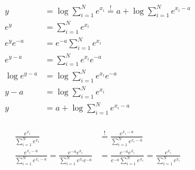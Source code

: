 

\newcommand{\ExerciseNumber}{09}

\newcommand{\PersonOne}{Marcel Bruckner (03674122)}
\newcommand{\PersonTwo}{Julian Hohenadel (03673879)}
\newcommand{\PersonThree}{Kevin Bein (03707775)}






%
%
%
\begin{flushleft}
\begin{align*}
y &= \log \sum_{i=1}^{N}e^{x_i} \stackrel{!}{=} a + \log \sum_{i=1}^{N}e^{x_i-a}\\
e^y &= \sum_{i=1}^{N}e^{x_i}\\
e^y e^{-a} &= e^{-a} \sum_{i=1}^{N}e^{x_i}\\
e^{y-a} &= \sum_{i=1}^{N}e^{x_i} e^{-a} \\
\log e^{y-a} &= \log \sum_{i=1}^{N}e^{x_i} e^{-a}\\
y-a &= \log \sum_{i=1}^{N}e^{x_i}\\
y &= a + \log \sum_{i=1}^{N}e^{x_i - a}\\
\end{align*}
\end{flushleft}
%
%
%
\begin{flushleft}
\begin{align*}
\frac{e^{x_i}}{\sum^{N}_{i=1} e^{x_i}} &\stackrel{!}{=} 
\frac{e^{x_{i}-a}}{\sum^{N}_{i=1} e^{x_i - a}}\\
\frac{e^{x_{i}-a}}{\sum^{N}_{i=1} e^{x_i - a}} = 
\frac{e^{-a}e^{x_{i}}}{\sum^{N}_{i=1} e^{x_i} e^{-a}} &=
\frac{e^{-a}e^{x_{i}}}{e^{-a} \sum^{N}_{i=1} e^{x_i}} =
\frac{e^{x_i}}{\sum^{N}_{i=1} e^{x_i}}\\
\end{align*}
\end{flushleft}
%
%
%

%
%





